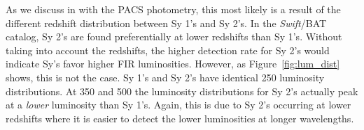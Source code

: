 As we discuss in \citet{Melendez:2014yu} with the PACS photometry, this most likely is a result of the different redshift distribution between Sy 1's and Sy 2's. In the \textit{Swift}/BAT catalog, Sy 2's are found preferentially at lower redshifts than Sy 1's. Without taking into account the redshifts, the higher detection rate for Sy 2's would indicate Sy's favor higher FIR luminosities. However, as Figure~\ref{fig:lum_dist} shows, this is not the case. Sy 1's and Sy 2's have identical 250 \um{} luminosity distributions. At 350 and 500 \um{} the luminosity distributions for Sy 2's actually peak at a \textit{lower} luminosity than Sy 1's. Again, this is due to Sy 2's occurring at lower redshifts where it is easier to detect the lower luminosities at longer wavelengths.